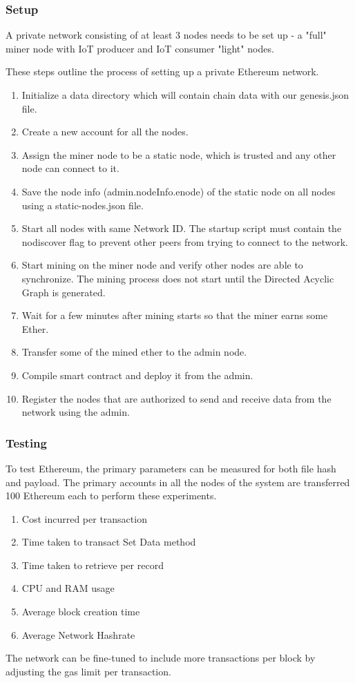 \documentclass[11pt,openright]{report}
\begin{document}
\subsubsection{Setup}
A private network consisting of at least 3 nodes needs to be set up - a "full" miner node with IoT producer and IoT consumer "light" nodes.

These steps outline the process of setting up a private Ethereum network.
\begin{enumerate}
    \item Initialize a data directory which will contain chain data with our genesis.json file.
    \item Create a new account for all the nodes.
    \item Assign the miner node to be a static node, which is trusted and any other node can connect to it. 
    \item Save the node info (admin.nodeInfo.enode) of the static node on all nodes using a static-nodes.json file.
    \item Start all nodes with same Network ID. The startup script must contain the nodiscover flag to prevent other peers from trying to connect to the network.
    \item Start mining on the miner node and verify other nodes are able to synchronize. The mining process does not start until the Directed Acyclic Graph is generated. 
    \item Wait for a few minutes after mining starts so that the miner earns some Ether.
    \item Transfer some of the mined ether to the admin node.
    \item Compile smart contract and deploy it from the admin.
    \item Register the nodes that are authorized to send and receive data from the network using the admin.
\end{enumerate}


\subsubsection{Testing}
To test Ethereum, the primary parameters can be measured for both file hash and payload. The primary accounts in all the nodes of the system are transferred 100 Ethereum each to perform these experiments. 
\begin{enumerate}
    \item Cost incurred per transaction
    \item Time taken to transact Set Data method
    \item Time taken to retrieve per record
    \item CPU and RAM usage
    \item Average block creation time
    \item Average Network Hashrate
\end{enumerate}
The network can be fine-tuned to include more transactions per block by adjusting the gas limit per transaction.
\end{document}

